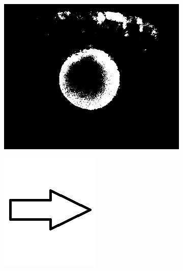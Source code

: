 \documentclass{article}
\begin{document}
\begin{figure}[H]
\begin{subfigure}{.47\textwidth}
  \centering
  \includegraphics[width=0.97\linewidth]{_Figures/raw_data_3_binary.png}
  \caption{}
  \label{fig:raw_3}
\end{subfigure}%
\begin{subfigure}{.09\textwidth}
  \centering
  \includegraphics[width=0.97\linewidth]{_Figures/leftrightarrow.jpg}

\end{subfigure}
\end{figure}
\end{document}
